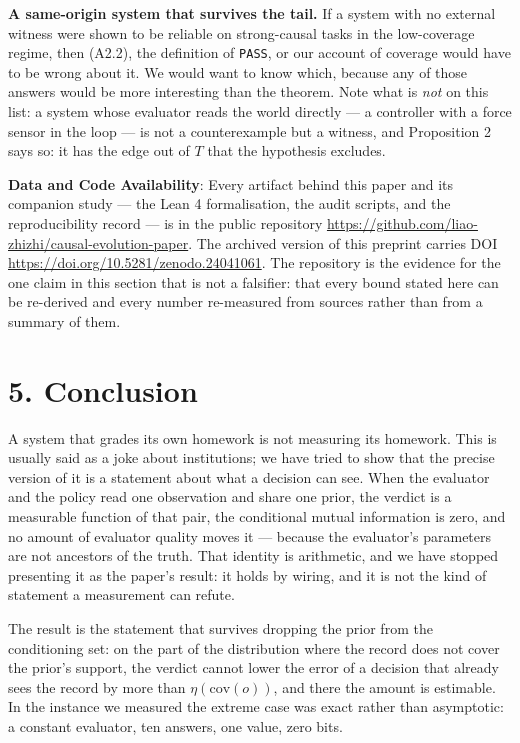 \documentclass[11pt,a4paper]{article}
\begin{document}
\textbf{A same-origin system that survives the tail.} If a system with no external
witness were shown to be reliable on strong-causal tasks in the low-coverage
regime, then (A2.2), the definition of \texttt{PASS}, or our account of coverage would have
to be wrong about it. We would want to know which, because any of those answers
would be more interesting than the theorem. Note what is \emph{not} on this list: a
system whose evaluator reads the world directly --- a controller with a force sensor
in the loop --- is not a counterexample but a witness, and Proposition 2 says so:
it has the edge out of \(T\) that the hypothesis excludes.

\textbf{Data and Code Availability}: Every artifact behind this paper and its
companion study --- the Lean 4 formalisation, the audit scripts, and the
reproducibility record --- is in the public repository
\url{https://github.com/liao-zhizhi/causal-evolution-paper}. The archived
version of this preprint carries DOI \url{https://doi.org/10.5281/zenodo.24041061}.
The repository is the evidence for the one claim in this section that is not a
falsifier: that every bound stated here can be re-derived and every number
re-measured from sources rather than from a summary of them.

\section{5. Conclusion}\label{conclusion}

A system that grades its own homework is not measuring its homework. This is
usually said as a joke about institutions; we have tried to show that the precise
version of it is a statement about what a decision can see. When the evaluator and
the policy read one observation and share one prior, the verdict is a measurable
function of that pair, the conditional mutual information is zero, and no amount of
evaluator quality moves it --- because the evaluator's parameters are not ancestors
of the truth. That identity is arithmetic, and we have stopped presenting it as the
paper's result: it holds by wiring, and it is not the kind of statement a
measurement can refute.

The result is the statement that survives dropping the prior from the conditioning
set: on the part of the distribution where the record does not cover the prior's
support, the verdict cannot lower the error of a decision that already sees the
record by more than \(\eta(\mathrm{cov}(o))\), and there the amount is estimable. In
the instance we measured the extreme case was exact rather than asymptotic: a
constant evaluator, ten answers, one value, zero bits.
\end{document}
